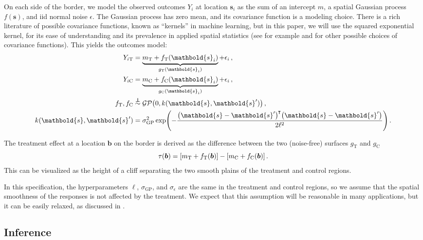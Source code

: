 \documentclass[letter]{article}
\DeclarePairedDelimiter{\parenthesis}{\lparen}{\rparen}
\DeclarePairedDelimiter{\squarebracket}{\lbrack}{\rbrack}
\newcommand{\del}[1]{\parenthesis*{#1}}
\newcommand{\sbr}[1]{\squarebracket*{#1}}
\newcommand{\gp}{\mathcal{GP}}
\newcommand*{\trans}{^{\mkern-1.5mu\intercal}}
\newcommand{\treat}{\mathrm{T}}
\newcommand{\ctrol}{\mathrm{C}}
\newcommand{\sigmaf}{\sigma_{\mathrm{GP}}}
\newcommand{\sigman}{\sigma_{\epsilon}}
\newcommand{\svec}{\mathbold{s}}
\newcommand{\indep}{\protect\mathpalette{\protect\independenT}{\perp}}
\def\independenT#1#2{\mathrel{\rlap{$#1#2$}\mkern2mu{#1#2}}}
\newcommand{\sentinel}{\bm{b}}
\newcommand{\eqlabel}[1]{\label{#1}}
\renewcommand{\cite}[1]{\citet{#1}}
\begin{document}
On each side of the border, we model the observed outcomes \(Y_i\) at location \(\svec_i\) as the sum of an intercept \(m\), a spatial Gaussian process \(f(\svec)\), and iid normal noise \(\epsilon\).
The Gaussian process has zero mean, and its covariance function is a modeling choice.
There is a rich literature of possible covariance functions, known as ``kernels'' in machine learning, but in this paper, we will use the squared exponential kernel, for its ease of understanding and its prevalence in applied spatial statistics
(see for example \cite{banerjee2014hierarchical} and \cite{rasmussen2006gaussian} for other possible choices of covariance functions).
This yields the outcomes model:
\begin{equation}
\begin{split}
Y_{i\treat} &= \underbrace{m_\treat{} + f_\treat{}(\svec_i)}_{g_\treat{}(\svec_i)} + \epsilon_i \,, \\
Y_{i\ctrol} &= \underbrace{m_\ctrol{} + f_\ctrol{}(\svec_i)}_{g_\ctrol{}(\svec_i)} + \epsilon_i \,, \\
f_\treat{}, f_\ctrol{} &\overset{\indep}{\sim} \gp\del{0, k(\svec, \svec')} \,, \\
k(\svec,\svec') &= \sigmaf^2 \exp\del{ - \frac{\del{\svec-\svec'}\trans\del{\svec-\svec'}}{2 \ell^2}} \,.
\end{split}
\eqlabel{eq:spec2gp}
\end{equation}
    


    	The treatment effect at a location \(\sentinel\) on the border is derived as the difference between the two (noise-free) surfaces \(g_\treat{}\) and \(g_\ctrol{}\)
\begin{equation}
\tau(\sentinel) = \sbr{m_\treat{} + f_\treat{}(\sentinel)} - \sbr{m_\ctrol{} + f_\ctrol{}(\sentinel)}\,.
\end{equation}
This can be visualized as the height of a cliff separating the two smooth plains of the treatment and control regions.

In this specification, the hyperparameters \(\ell\), \(\sigmaf\), and \(\sigman\) are the same in the treatment and control regions, so we assume that the spatial smoothness of the responses is not affected by the treatment.
We expect that this assumption will be reasonable in many applications, but it can be easily relaxed, as discussed in \cite{Branson:2017qy}.
    


    	\hypertarget{inference}{%
\subsection{Inference}\label{inference}}
\end{document}

